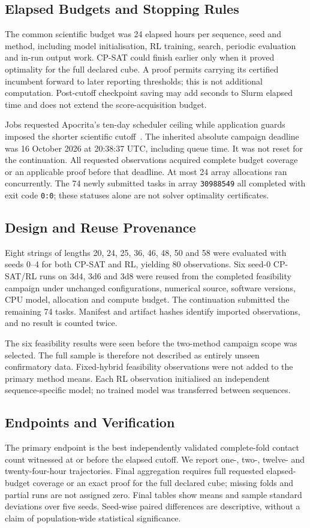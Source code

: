 \documentclass{article}
\theoremstyle{plain}
\theoremstyle{definition}
\begin{document}
\subsection{Elapsed Budgets and Stopping Rules}
The common scientific budget was 24 elapsed hours per sequence, seed and method, including model initialisation, RL training, search, periodic evaluation and in-run output work. CP-SAT could finish earlier only when it proved optimality for the full declared cube. A proof permits carrying its certified incumbent forward to later reporting thresholds; this is not additional computation. Post-cutoff checkpoint saving may add seconds to Slurm elapsed time and does not extend the score-acquisition budget.

Jobs requested Apocrita's ten-day scheduler ceiling while application guards imposed the shorter scientific cutoff~\cite{ApocritaRuntime}. The inherited absolute campaign deadline was 16 October 2026 at 20:38:37 UTC, including queue time. It was not reset for the continuation. All requested observations acquired complete budget coverage or an applicable proof before that deadline. At most 24 array allocations ran concurrently. The 74 newly submitted tasks in array \texttt{30988549} all completed with exit code \texttt{0:0}; these statuses alone are not solver optimality certificates.

\subsection{Design and Reuse Provenance}
Eight strings of lengths 20, 24, 25, 36, 46, 48, 50 and 58 were evaluated with seeds 0--4 for both CP-SAT and RL, yielding 80 observations. Six seed-0 CP-SAT/RL runs on 3d4, 3d6 and 3d8 were reused from the completed feasibility campaign under unchanged configurations, numerical source, software versions, CPU model, allocation and compute budget. The continuation submitted the remaining 74 tasks. Manifest and artifact hashes identify imported observations, and no result is counted twice.

The six feasibility results were seen before the two-method campaign scope was selected. The full sample is therefore not described as entirely unseen confirmatory data. Fixed-hybrid feasibility observations were not added to the primary method means. Each RL observation initialised an independent sequence-specific model; no trained model was transferred between sequences.

\subsection{Endpoints and Verification}
The primary endpoint is the best independently validated complete-fold contact count witnessed at or before the elapsed cutoff. We report one-, two-, twelve- and twenty-four-hour trajectories. Final aggregation requires full requested elapsed-budget coverage or an exact proof for the full declared cube; missing folds and partial runs are not assigned zero. Final tables show means and sample standard deviations over five seeds. Seed-wise paired differences are descriptive, without a claim of population-wide statistical significance.
\end{document}
